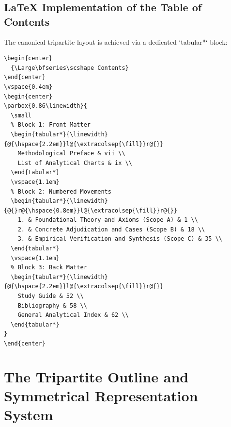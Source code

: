 \documentclass[11pt,letterpaper]{article}
\begin{document}
\subsection{\LaTeX{} Implementation of the Table of Contents}
The canonical tripartite layout is achieved via a dedicated `tabular*` block:

\begin{lstlisting}
\begin{center}
  {\Large\bfseries\scshape Contents}
\end{center}
\vspace{0.4em}
\begin{center}
\parbox{0.86\linewidth}{
  \small
  % Block 1: Front Matter
  \begin{tabular*}{\linewidth}{@{\hspace{2.2em}}l@{\extracolsep{\fill}}r@{}}
    Methodological Preface & vii \\
    List of Analytical Charts & ix \\
  \end{tabular*}
  \vspace{1.1em}
  % Block 2: Numbered Movements
  \begin{tabular*}{\linewidth}{@{}r@{\hspace{0.8em}}l@{\extracolsep{\fill}}r@{}}
    1. & Foundational Theory and Axioms (Scope A) & 1 \\
    2. & Concrete Adjudication and Cases (Scope B) & 18 \\
    3. & Empirical Verification and Synthesis (Scope C) & 35 \\
  \end{tabular*}
  \vspace{1.1em}
  % Block 3: Back Matter
  \begin{tabular*}{\linewidth}{@{\hspace{2.2em}}l@{\extracolsep{\fill}}r@{}}
    Study Guide & 52 \\
    Bibliography & 58 \\
    General Analytical Index & 62 \\
  \end{tabular*}
}
\end{center}
\end{lstlisting}

\section{The Tripartite Outline and Symmetrical Representation System}
\end{document}
